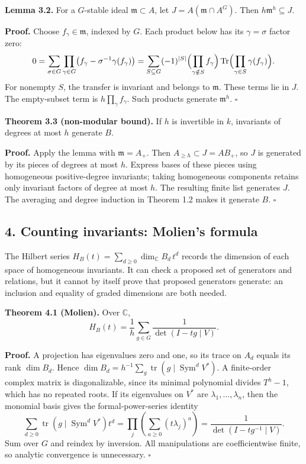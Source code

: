 \documentclass[
]{article}
\begin{document}
\protect{}\label{lemma-3-2}{}

\textbf{Lemma 3.2.} For a \(G\)-stable ideal \(\mathfrak m\subset A\),
let \(J=A(\mathfrak m\cap A^G)\). Then \(h\mathfrak m^h\subseteq J\).

\textbf{Proof.} Choose \(f_\gamma\in\mathfrak m\), indexed by \(G\).
Each product below has its \(\gamma=\sigma\) factor zero: \[
0=\sum_{\sigma\in G}\prod_{\gamma\in G}
\bigl(f_\gamma-\sigma^{-1}\gamma(f_\gamma)\bigr)
=\sum_{S\subseteq G}(-1)^{|S|}
\Bigl(\prod_{\gamma\notin S}f_\gamma\Bigr)
\operatorname{Tr}\Bigl(\prod_{\gamma\in S}\gamma(f_\gamma)\Bigr).
\] For nonempty \(S\), the transfer is invariant and belongs to
\(\mathfrak m\). These terms lie in \(J\). The empty-subset term is
\(h\prod_\gamma f_\gamma\). Such products generate \(\mathfrak m^h\).
\(\square\)

\protect{}\label{theorem-3-3}{}

\textbf{Theorem 3.3 (non-modular bound).} If \(h\) is invertible in
\(k\), invariants of degrees at most \(h\) generate \(B\).

\textbf{Proof.} Apply the lemma with \(\mathfrak m=A_+\). Then
\(A_{\geq h}\subset J=AB_+\), so \(J\) is generated by its pieces of
degrees at most \(h\). Express bases of these pieces using homogeneous
positive-degree invariants; taking homogeneous components retains only
invariant factors of degree at most \(h\). The resulting finite list
generates \(J\). The averaging and degree induction in Theorem 1.2 makes
it generate \(B\). \(\square\)

\subsection{4. Counting invariants: Molien's
formula}\label{counting-invariants-moliens-formula}

The Hilbert series \(H_B(t)=\sum_{d\geq0}\dim_{\mathbb C}B_d\,t^d\)
records the dimension of each space of homogeneous invariants. It can
check a proposed set of generators and relations, but it cannot by
itself prove that proposed generators generate: an inclusion and
equality of graded dimensions are both needed.

\protect{}\label{theorem-4-1}{}

\textbf{Theorem 4.1 (Molien).} Over \(\mathbb C\), \[
H_B(t)=\frac1h\sum_{g\in G}\frac1{\det(I-tg\mid V)}.
\]

\textbf{Proof.} A projection has eigenvalues zero and one, so its trace
on \(A_d\) equals its rank \(\dim B_d\). Hence
\(\dim B_d=h^{-1}\sum_g\operatorname{tr}(g\mid\operatorname{Sym}^dV^*)\).
A finite-order complex matrix is diagonalizable, since its minimal
polynomial divides \(T^h-1\), which has no repeated roots. If its
eigenvalues on \(V^*\) are \(\lambda_1,\ldots,\lambda_n\), then the
monomial basis gives the formal-power-series identity \[
\sum_{d\geq0}\operatorname{tr}(g\mid\operatorname{Sym}^dV^*)t^d
=\prod_j\left(\sum_{a\geq0}(t\lambda_j)^a\right)
=\frac1{\det(I-tg^{-1}\mid V)}.
\] Sum over \(G\) and reindex by inversion. All manipulations are
coefficientwise finite, so analytic convergence is unnecessary.
\(\square\)
\end{document}
